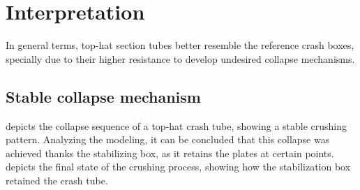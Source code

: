\documentclass[cmfonts]{witpress}
\begin{document}
\section{Interpretation}  %
\label{sec:interpretation}

In general terms, top-hat section tubes better resemble the reference crash boxes, specially due to their higher resistance to develop undesired collapse mechanisms.

\subsection{Stable collapse mechanism}

 depicts the collapse sequence of a top-hat crash tube, showing a stable crushing pattern. Analyzing the modeling, it can be concluded that this collapse was achieved thanks the stabilizing box, as it retains the plates at certain points.  depicts the final state of the crushing process, showing how the stabilization box retained the crash tube.
\end{document}
